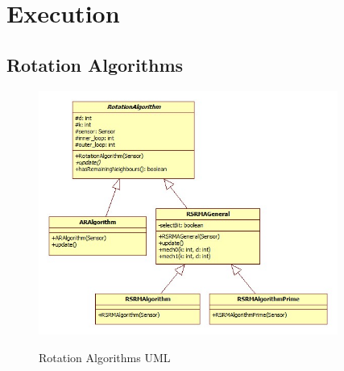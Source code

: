 \section{Execution}

\subsection*{Rotation Algorithms}

\begin{figure}[ht]
\centering
\caption{Rotation Algorithms UML}
\includegraphics[height = 8cm]{pics/algo.jpg}\\[0.5cm]    
\label{fig:rotalgo}
\end{figure}

